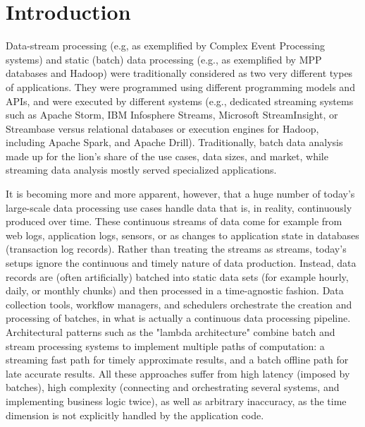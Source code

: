 \documentclass[11pt]{article}
\begin{document}


\section{Introduction}
\label{sec:intro}
Data-stream processing (e.g, as exemplified by Complex Event Processing systems) and static (batch) data processing (e.g., as exemplified by MPP databases and Hadoop) were traditionally considered as two very different types of applications. They were programmed using different programming models and APIs, and were executed by different systems (e.g., dedicated streaming systems such as  Apache Storm, IBM Infosphere Streams, Microsoft StreamInsight, or Streambase versus relational databases or execution engines for Hadoop, including Apache Spark, and Apache Drill). Traditionally, batch data analysis made up for the lion's share of the use cases, data sizes, and market, while streaming data analysis mostly served specialized applications.

It is becoming more and more apparent, however, that a huge number of today's large-scale data processing use cases handle data that is, in reality, continuously produced over time. These continuous streams of data come for example from web logs, application logs, sensors, or as changes to application state in databases (transaction log records). Rather than treating the streams as streams, today's setups ignore the continuous and timely nature of data production. Instead, data records are (often artificially) batched into static data sets (for example hourly, daily, or monthly chunks) and then processed in a time-agnostic fashion. Data collection tools, workflow managers, and schedulers orchestrate the creation and processing of batches, in what is actually a continuous data processing pipeline. Architectural patterns such as the "lambda architecture" \cite{marz2015big} combine batch and stream processing systems to implement multiple paths of computation: a streaming fast path for timely approximate results, and a batch offline path for late accurate results. All these approaches suffer from high latency (imposed by batches), high complexity (connecting and orchestrating several systems, and implementing business logic twice), as well as arbitrary inaccuracy, as the time dimension is not explicitly handled by the application code.
\end{document}
